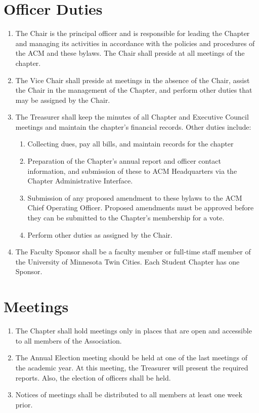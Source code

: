 \section{Officer Duties}
\begin{enumerate}
	\item The Chair is the principal officer and is responsible for leading the Chapter and managing its activities in accordance with the policies and procedures of the ACM and these bylaws. The Chair shall preside at all meetings of the chapter.
	\item The Vice Chair shall preside at meetings in the absence of the Chair, assist the Chair in the management of the Chapter, and perform other duties that may be assigned by the Chair.
	\item The Treasurer shall keep the minutes of all Chapter and Executive Council meetings and maintain the chapter's financial records. Other duties include:
		\begin{enumerate}
			\item Collecting dues, pay all bills, and maintain records for the chapter
			\item Preparation of the Chapter's annual report and officer contact information, and submission of these to ACM Headquarters via the Chapter Administrative Interface.
			\item Submission of any proposed amendment to these bylaws to the ACM Chief Operating Officer. Proposed amendments must be approved before they can be submitted to the Chapter's membership for a vote.
			\item Perform other duties as assigned by the Chair.
		\end{enumerate}
	\item  The Faculty Sponsor shall be a faculty member or full-time staff member of the University of Minnesota Twin Cities. Each Student Chapter has one Sponsor.
\end{enumerate}

\section{Meetings}
\begin{enumerate}
	\item The Chapter shall hold meetings only in places that are open and accessible to all members of the Association.
	\item The Annual Election meeting should be held at one of the last meetings of the academic year. At this meeting, the Treasurer will present the required reports. Also, the election of officers shall be held.
	\item Notices of meetings shall be distributed to all members at least one week prior.
\end{enumerate}


